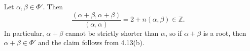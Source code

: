 Let $\alpha, \beta \in \Phi'$. Then
\[ \frac{(\alpha + \beta, \alpha + \beta)}{(\alpha, \alpha)} = 2 + n(\alpha, \beta) \in \mathbb{Z}. \]
In particular, $\alpha + \beta$ cannot be strictly shorter than $\alpha$,
so if $\alpha + \beta$ is a root, then $\alpha + \beta \in \Phi'$ and the
claim follows from 4.13(b).
